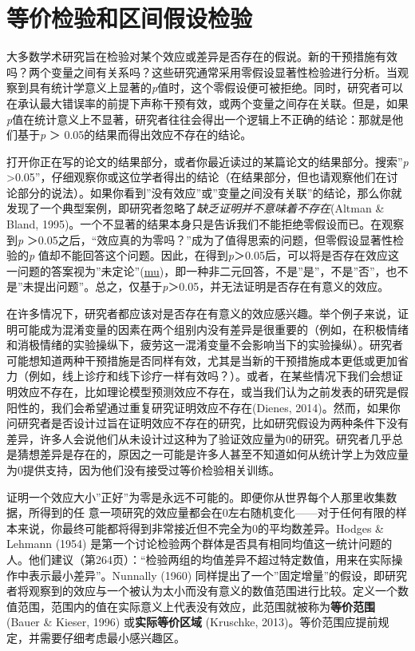 \documentclass[
  letterpaper,
  DIV=11,
  numbers=noendperiod]{scrreprt}
\begin{document}

\hypertarget{equivalencetest}{%
\chapter{等价检验和区间假设检验}\label{equivalencetest}}

大多数学术研究旨在检验对某个效应或差异是否存在的假说。新的干预措施有效吗？两个变量之间有关系吗？这些研究通常采用零假设显著性检验进行分析。当观察到具有统计学意义上显著的\emph{p}值时，这个零假设便可被拒绝。同时，研究者可以在承认最大错误率的前提下声称干预有效，或两个变量之间存在关联。但是，如果\emph{p}值在统计意义上不显著，研究者往往会得出一个逻辑上不正确的结论：那就是他们基于\emph{p}
＞ 0.05的结果而得出效应不存在的结论。

打开你正在写的论文的结果部分，或者你最近读过的某篇论文的结果部分。搜索''\emph{p}
\textgreater0.05''，仔细观察你或这位学者得出的结论（在结果部分，但也请观察他们在讨论部分的说法）。如果你看到''没有效应''或''变量之间没有关联''的结论，那么你就发现了一个典型案例，即研究者忽略了\emph{缺乏证明并不意味着不存在}(Altman
\& Bland,
1995)。一个不显著的结果本身只是告诉我们不能拒绝零假设而已。在观察到\emph{p}
＞0.05之后，``效应真的为零吗？''成为了值得思索的问题，但零假设显著性检验的\emph{p}
值却不能回答这个问题。因此，在得到\emph{p}＞0.05后，可以将是否存在效应这一问题的答案视为''未定论''(\href{https://en.wikipedia.org/wiki/Mu_(negative)\#Non-dualistic_meaning}{mu})，即一种非二元回答，不是''是''，不是''否''，也不是''未提出问题''。总之，仅基于\emph{p}＞0.05，并无法证明是否存在有意义的效应。

在许多情况下，研究者都应该对是否存在有意义的效应感兴趣。举个例子来说，证明可能成为混淆变量的因素在两个组别内没有差异是很重要的（例如，在积极情绪和消极情绪的实验操纵下，疲劳这一混淆变量不会影响当下的实验操纵）。研究者可能想知道两种干预措施是否同样有效，尤其是当新的干预措施成本更低或更加省力（例如，线上诊疗和线下诊疗一样有效吗？）。或者，在某些情况下我们会想证明效应不存在，比如理论模型预测效应不存在，或当我们认为之前发表的研究是假阳性的，我们会希望通过重复研究证明效应不存在(Dienes,
2014)。然而，如果你问研究者是否设计过旨在证明效应不存在的研究，比如研究假设为两种条件下没有差异，许多人会说他们从未设计过这种为了验证效应量为0的研究。研究者几乎总是猜想差异是存在的，原因之一可能是许多人甚至不知道如何从统计学上为效应量为0提供支持，因为他们没有接受过等价检验相关训练。

证明一个效应大小''正好''为零是永远不可能的。即便你从世界每个人那里收集数据，所得到的任
意一项研究的效应量都会在0左右随机变化------对于任何有限的样本来说，你最终可能都将得到非常接近但不完全为0的平均数差异。Hodges
\& Lehmann (1954)
是第一个讨论检验两个群体是否具有相同均值这一统计问题的人。他们建议（第264页）：``检验两组的均值差异不超过特定数值，用来在实际操作中表示最小差异''。Nunnally
(1960)
同样提出了一个''固定增量''的假设，即研究者将观察到的效应与一个被认为太小而没有意义的数值范围进行比较。定义一个数值范围，范围内的值在实际意义上代表没有效应，此范围就被称为\textbf{等价范围}
(Bauer \& Kieser, 1996) 或\textbf{实际等价区域} (Kruschke,
2013)。等价范围应提前规定，并需要仔细考虑最小感兴趣区。
\end{document}

